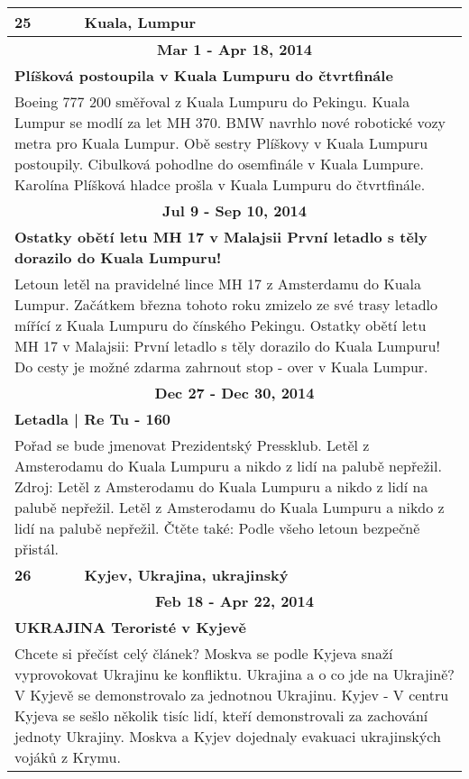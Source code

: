 \begin{tabularx}{\linewidth}{l l}
            \bf 25 & \bf Kuala, Lumpur \\ \midrule
            
                \multicolumn{2}{c}{\bf Mar 1 - Apr 18, 2014} \\
                \multicolumn{2}{p{\linewidth}}{\bf Plíšková postoupila v Kuala Lumpuru do čtvrtfinále} \\
                \multicolumn{2}{p{\linewidth}}{Boeing 777 200 směřoval z Kuala Lumpuru do Pekingu. Kuala Lumpur se modlí za let MH 370. BMW navrhlo nové robotické vozy metra pro Kuala Lumpur. Obě sestry Plíškovy v Kuala Lumpuru postoupily. Cibulková pohodlne do osemfinále v Kuala Lumpure. Karolína Plíšková hladce prošla v Kuala Lumpuru do čtvrtfinále.} \\ \midrule
                
                \multicolumn{2}{c}{\bf Jul 9 - Sep 10, 2014} \\
                \multicolumn{2}{p{\linewidth}}{\bf Ostatky obětí letu MH 17 v Malajsii První letadlo s těly dorazilo do Kuala Lumpuru!} \\
                \multicolumn{2}{p{\linewidth}}{Letoun letěl na pravidelné lince MH 17 z Amsterdamu do Kuala Lumpur. Začátkem března tohoto roku zmizelo ze své trasy letadlo mířící z Kuala Lumpuru do čínského Pekingu. Ostatky obětí letu MH 17 v Malajsii: První letadlo s těly dorazilo do Kuala Lumpuru! Do cesty je možné zdarma zahrnout stop - over v Kuala Lumpur.} \\ \midrule
                
                \multicolumn{2}{c}{\bf Dec 27 - Dec 30, 2014} \\
                \multicolumn{2}{p{\linewidth}}{\bf Letadla | Re Tu - 160} \\
                \multicolumn{2}{p{\linewidth}}{Pořad se bude jmenovat Prezidentský Pressklub. Letěl z Amsterodamu do Kuala Lumpuru a nikdo z lidí na palubě nepřežil. Zdroj: Letěl z Amsterodamu do Kuala Lumpuru a nikdo z lidí na palubě nepřežil. Letěl z Amsterodamu do Kuala Lumpuru a nikdo z lidí na palubě nepřežil. Čtěte také: Podle všeho letoun bezpečně přistál.} \\ \midrule
                [1.5pt]

            \bf 26 & \bf Kyjev, Ukrajina, ukrajinský \\ \midrule
            
                \multicolumn{2}{c}{\bf Feb 18 - Apr 22, 2014} \\
                \multicolumn{2}{p{\linewidth}}{\bf UKRAJINA Teroristé v Kyjevě} \\
                \multicolumn{2}{p{\linewidth}}{Chcete si přečíst celý článek? Moskva se podle Kyjeva snaží vyprovokovat Ukrajinu ke konfliktu. Ukrajina a o co jde na Ukrajině? V Kyjevě se demonstrovalo za jednotnou Ukrajinu. Kyjev - V centru Kyjeva se sešlo několik tisíc lidí, kteří demonstrovali za zachování jednoty Ukrajiny. Moskva a Kyjev dojednaly evakuaci ukrajinských vojáků z Krymu.} \\ \midrule
                

\end{tabularx}
